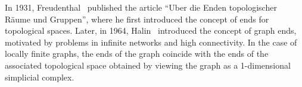 \documentclass{amsart}
\theoremstyle{definition}
\theoremstyle{remark}
\numberwithin{equation}{section}
\begin{document}
In 1931, Freudenthal~\cite{Freudenthal1931} published the article ``Uber die Enden topologischer R\"aume und Gruppen'', where he first introduced the concept of ends for topological spaces. Later, in 1964, Halin~\cite{Halin1964} introduced the concept of graph ends, motivated by problems in infinite networks and high connectivity. In the case of locally finite graphs, the ends of the graph coincide with the ends of the associated topological space obtained by viewing the graph as a 1-dimensional simplicial complex.
\begin{figure}[htb]
	\centering
	
	
	
	
	\begin{tikzpicture}[x=0.75pt,y=0.75pt,yscale=-1,xscale=1]
		

\end{tikzpicture}
\end{figure}
\end{document}
